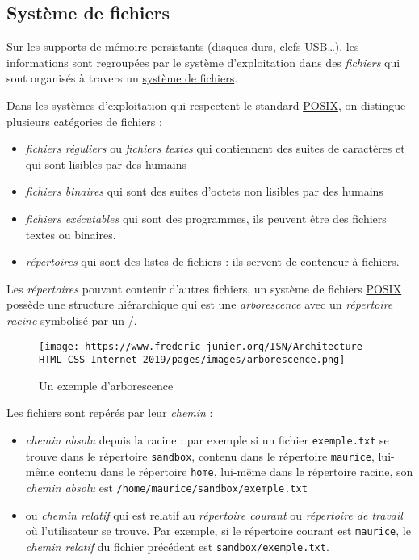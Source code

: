 \documentclass[
  11pt,
]{article}
\providecommand{\tightlist}{%
  \setlength{\itemsep}{0pt}\setlength{\parskip}{0pt}}
\newcounter{prog}
\begin{document}
\hypertarget{systuxe8me-de-fichiers}{%
\subsection{Système de fichiers}\label{systuxe8me-de-fichiers}}

Sur les supports de mémoire persistants (disques durs, clefs USB\ldots),
les informations sont regroupées par le système d'exploitation dans des
\emph{fichiers} qui sont organisés à travers un
\href{https://fr.wikipedia.org/wiki/Syst\%C3\%A8me_de_fichiers}{système
de fichiers}.

Dans les systèmes d'exploitation qui respectent le standard
\href{https://fr.wikipedia.org/wiki/POSIX}{POSIX}, on distingue
plusieurs catégories de fichiers :

\begin{itemize}
\tightlist
\item
  \emph{fichiers réguliers} ou \emph{fichiers textes} qui contiennent
  des suites de caractères et qui sont lisibles par des humains
\item
  \emph{fichiers binaires} qui sont des suites d'octets non lisibles par
  des humains
\item
  \emph{fichiers exécutables} qui sont des programmes, ils peuvent être
  des fichiers textes ou binaires.
\item
  \emph{répertoires} qui sont des listes de fichiers : ils servent de
  conteneur à fichiers.
\end{itemize}

Les \emph{répertoires} pouvant contenir d'autres fichiers, un système de
fichiers \href{https://fr.wikipedia.org/wiki/POSIX}{POSIX} possède une
structure hiérarchique qui est une \emph{arborescence} avec un
\emph{répertoire racine} symbolisé par un /.

\begin{figure}
\centering
\texttt{[image: https://www.frederic-junier.org/ISN/Architecture-HTML-CSS-Internet-2019/pages/images/arborescence.png]}
\caption{Un exemple d'arborescence}
\end{figure}

Les fichiers sont repérés par leur \emph{chemin} :

\begin{itemize}
\item
  \emph{chemin absolu} depuis la racine : par exemple si un fichier
  \texttt{exemple.txt} se trouve dans le répertoire \texttt{sandbox},
  contenu dans le répertoire \texttt{maurice}, lui-même contenu dans le
  répertoire \texttt{home}, lui-même dans le répertoire racine, son
  \emph{chemin absolu} est \texttt{/home/maurice/sandbox/exemple.txt}
\item
  ou \emph{chemin relatif} qui est relatif au \emph{répertoire courant}
  ou \emph{répertoire de travail} où l'utilisateur se trouve. Par
  exemple, si le répertoire courant est \texttt{maurice}, le
  \emph{chemin relatif} du fichier précédent est
  \texttt{sandbox/exemple.txt}.
\end{itemize}
\end{document}
